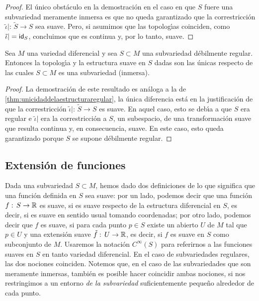 \begin{proof}
	El \'{u}nico obst\'{a}culo en la demostraci\'{o}n en el caso
	en que $S$ fuere una subvariedad meramente inmersa es que no queda
	garantizado que la correstricci\'{o}n
	$\tilde{\iota}|:\,\tilde{S}\rightarrow S$ sea suave. Pero, si
	asumimos que las topolog\'{\i}as coinciden, como
	$\tilde{\iota}|=\id[S]$, concluimos que es continua y, por lo tanto,
	suave.
\end{proof}

\begin{teoUnicidadDebilmenteRegular}\label{thm:unicidaddebilmenteregular}
	Sea $M$ una variedad diferencial y sea $S\subset M$ una
	subvariedad d\'{e}bilmente regular. Entonces la topolog\'{\i}a y la
	estructura suave en $S$ dadas son las \'{u}nicas respecto de las
	cuales $S\subset M$ es una subvariedad (inmersa).
\end{teoUnicidadDebilmenteRegular}

\begin{proof}
	La demostraci\'{o}n de este resultado es an\'{a}loga a la de
	\ref{thm:unicidaddelaestructuraregular}, la \'{u}nica diferencia
	est\'{a} en la justificaci\'{o}n de que la correstricci\'{o}n
	$\tilde{\iota}|:\,\tilde{S}\rightarrow S$ es suave. En aquel caso,
	esto se deb\'{\i}a a que $S$ era regular e $\tilde{\iota}|$ era la
	correstricci\'{o}n a $S$, un subespacio, de una transformaci\'{o}n
	suave que resulta continua y, en consecuencia, suave. En este caso,
	esto queda garantizado porque $S$ se supone d\'{e}bilmente regular.
\end{proof}

\subsection{Extensi\'{o}n de funciones}
Dada una subvariedad $S\subset M$, hemos dado dos definiciones de lo que
significa que una funci\'{o}n definida en $S$ sea suave: por un lado,
podemos decir que una funci\'{o}n $f:\,S\rightarrow\bb{R}$ es suave, si es
suave respecto de la estructura diferencial en $S$, es decir, si es suave en
sentido usual tomando coordenadas; por otro lado, podemos decir que $f$ es
suave, si para cada punto $p\in S$ existe un abierto $U$ de $M$ tal que
$p\in U$ y una extensi\'{o}n suave $\tilde{f}:\,U\rightarrow\bb{R}$, es decir,
si $f$ es suave en $S$ como subconjunto de $M$. Usaremos la notaci\'{o}n
$C^{\infty}(S)$ para referirnos a las funciones suaves en $S$ en tanto
variedad diferencial. En el caso de subvariedades regulares, las dos
nociones coinciden. Notemos que, en el caso de las subvariedades que son
meramente inmersas, tambi\'{e}n es posible hacer coincidir ambas nociones,
si nos restringimos a un entorno \emph{de la subvariedad} suficientemente
peque\~{n}o alrededor de cada punto.

